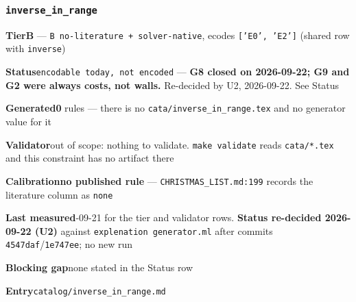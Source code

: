 \documentclass[10pt,a4paper]{article}
\newcommand{\entryfield}[2]{{\raggedright\textbf{#1}\quad #2\par}}
\begin{document}
\subsubsection*{\texttt{inverse\_\allowbreak{}in\_\allowbreak{}range}}
\label{entry:inverse-in-range}
\entryfield{Tier}{\textbf{B} --- \texttt{B no-\allowbreak{}literature + solver-\allowbreak{}native}, ecodes \texttt{['E0', 'E2']} (shared row with \texttt{inverse})}
\entryfield{Status}{\texttt{encodable today, not encoded} --- \textbf{G8 closed on 2026-09-22; G9 and G2 were always costs, not walls.} Re-decided by U2, 2026-09-22. See Status}
\entryfield{Generated}{\textbf{0} rules --- there is no \texttt{cata/\allowbreak{}inverse\_\allowbreak{}in\_\allowbreak{}range.\allowbreak{}tex} and no generator value for it}
\entryfield{Validator}{out of scope: nothing to validate. \texttt{make validate} reads \texttt{cata/*.tex} and this constraint has no artifact there}
\entryfield{Calibration}{\textbf{no published rule} --- \texttt{CHRISTMAS\_LIST.md:199} records the literature column as \texttt{none}}
\entryfield{Last measured}{2026-09-21 for the tier and validator rows. \textbf{Status re-decided 2026-09-22 (U2)} against \texttt{explenation generator.ml} after commits \texttt{4547daf}/\texttt{1e747ee}; no new run}
\entryfield{Blocking gap}{none stated in the Status row}
\entryfield{Entry}{\texttt{catalog/inverse\_in\_range.md}}
\end{document}
